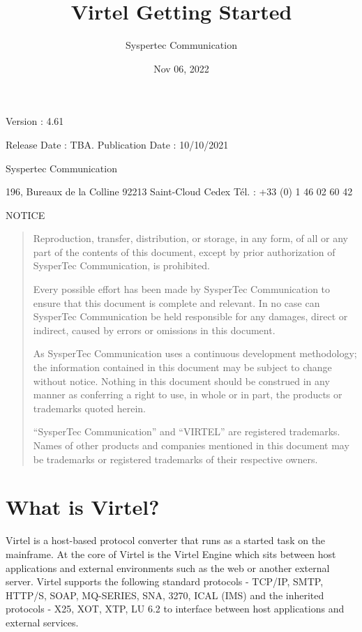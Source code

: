 \documentclass[letterpaper,10pt,english]{sphinxmanual}
\title{Virtel Getting Started}
\date{Nov 06, 2022}
\author{Syspertec Communication}
\begin{document}
\pagestyle{empty}
\sphinxmaketitle
\pagestyle{plain}
\sphinxtableofcontents
\pagestyle{normal}
\label{\detokenize{Getting_Started::doc}}



Version : 4.61

Release Date : TBA. Publication Date : 10/10/2021

Syspertec Communication

196, Bureaux de la Colline 92213 Saint-Cloud Cedex Tél. : +33 (0) 1 46 02 60 42


NOTICE
\begin{quote}

Reproduction, transfer, distribution, or storage, in any form, of all or any part of
the contents of this document, except by prior authorization of SysperTec
Communication, is prohibited.

Every possible effort has been made by SysperTec Communication to ensure that this document
is complete and relevant. In no case can SysperTec Communication be held responsible for
any damages, direct or indirect, caused by errors or omissions in this document.

As SysperTec Communication uses a continuous development methodology; the information
contained in this document may be subject to change without notice. Nothing in this
document should be construed in any manner as conferring a right to use, in whole or in
part, the products or trademarks quoted herein.

“SysperTec Communication” and “VIRTEL” are registered trademarks. Names of other products
and companies mentioned in this document may be trademarks or registered trademarks of
their respective owners.
\end{quote}


\chapter{What is Virtel?}
\label{\detokenize{Getting_Started:what-is-virtel}}
Virtel is a host-based protocol converter that runs as a started task on the mainframe. At the core of Virtel is the Virtel Engine which sits between host applications and external environments such as the web or another external server. Virtel supports the following standard protocols - TCP/IP, SMTP, HTTP/S, SOAP, MQ-SERIES, SNA, 3270, ICAL (IMS) and the inherited protocols - X25, XOT, XTP, LU 6.2 to interface between host applications and external services.
\end{document}
